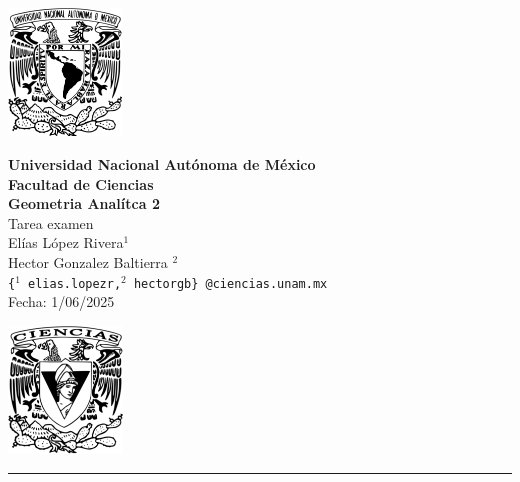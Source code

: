 \documentclass[11pt,letterpaper]{article}
\begin{document}

\begin{center}
    \begin{minipage}{3cm}
    	\begin{center}
    		\includegraphics[height=3.4cm]{logo_unam.png}
    	\end{center}
    \end{minipage}\hfill
    \begin{minipage}{10cm}
    	\begin{center}
    	\textbf{\large Universidad Nacional Autónoma de México}\\[0.1cm]
        \textbf{Facultad de Ciencias}\\[0.1cm]
        \textbf{Geometria Anal\'itca 2}\\[0.1cm]
        Tarea examen \\[0.1cm]
         El\'ias L\'opez Rivera$^{1}$\\[0.1cm]
         Hector Gonzalez Baltierra $^{2}$\\[0.1cm]
        \texttt{\{${^1}$\,elias.lopezr,${^2}$\,hectorgb\}\,@ciencias.unam.mx}\\[0.1cm]
        Fecha:\,\,1/06/2025
    	\end{center}
    \end{minipage}\hfill
    \begin{minipage}{3cm}
    	\begin{center}
    		\includegraphics[height=3.4cm]{logo_FC.png}
    	\end{center}
    \end{minipage}
\end{center}

\rule{17cm}{0.1mm}
\end{document}
